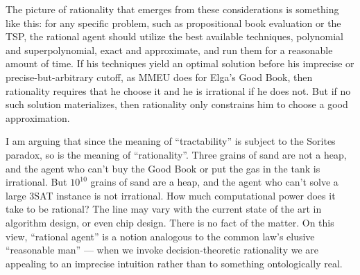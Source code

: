 \documentclass[letterpaper,12pt]{article}
\begin{document}
The picture of rationality that emerges from these considerations is something like this: for any specific problem, such as propositional book evaluation or the TSP, the rational agent should utilize the best available techniques, polynomial and superpolynomial, exact and approximate, and run them for a reasonable amount of time. If his techniques yield an optimal solution before his imprecise or precise-but-arbitrary cutoff, as MMEU does for Elga's Good Book, then rationality requires that he choose it and he is irrational if he does not. But if no such solution materializes, then rationality only constrains him to choose a good approximation.

I am arguing that since the meaning of ``tractability'' is subject to the Sorites paradox, so is the meaning of ``rationality''. Three grains of sand are not a heap, and the agent who can't buy the Good Book or put the gas in the tank is irrational. But $10^{10}$ grains of sand are a heap, and the agent who can't solve a large 3SAT instance is not irrational. How much computational power does it take to be rational? The line may vary with the current state of the art in algorithm design, or even chip design. There is no fact of the matter. On this view, ``rational agent'' is a notion analogous to the common law's elusive ``reasonable man'' --- when we invoke decision-theoretic rationality we are appealing to an imprecise intuition rather than to something ontologically real.
\end{document}
